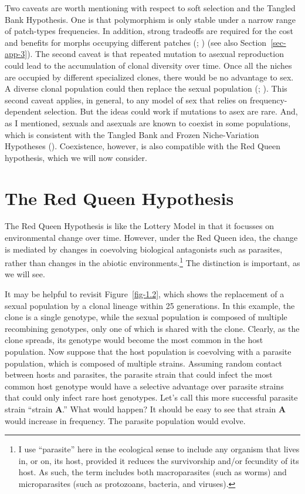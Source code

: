 \documentclass[
  american,
  letterpaper,
]{book}
\begin{document}
Two caveats are worth mentioning with respect to soft selection and the
Tangled Bank Hypothesis. One is that polymorphism is only stable under a
narrow range of patch-types frequencies. In addition, strong tradeoffs
are required for the cost and benefits for morphs occupying different
patches (;
) (see also
Section~\ref{sec-app-3}). The second caveat is that repeated mutation to
asexual reproduction could lead to the accumulation of clonal diversity
over time. Once all the niches are occupied by different specialized
clones, there would be no advantage to sex. A diverse clonal population
could then replace the sexual population (; ). This
second caveat applies, in general, to any model of sex that relies on
frequency-dependent selection. But the ideas could work if mutations to
asex are rare. And, as I mentioned, sexuals and asexuals are known to
coexist in some populations, which is consistent with the Tangled Bank
and Frozen Niche-Variation Hypotheses
().
Coexistence, however, is also compatible with the Red Queen hypothesis,
which we will now consider.

\section{The Red Queen Hypothesis}\label{the-red-queen-hypothesis}

The Red Queen Hypothesis is like the Lottery Model in that it focusses
on environmental change over time. However, under the Red Queen idea,
the change is mediated by changes in coevolving biological antagonists
such as parasites, rather than changes in the abiotic
environments.\footnote{I use ``parasite'' here in the ecological sense
  to include any organism that lives in, or on, its host, provided it
  reduces the survivorship and/or fecundity of its host. As such, the
  term includes both macroparasites (such as worms) and microparasites
  (such as protozoans, bacteria, and viruses).} The distinction is
important, as we will see.

It may be helpful to revisit Figure~\ref{fig-1.2}, which shows the
replacement of a sexual population by a clonal lineage within 25
generations. In this example, the clone is a single genotype, while the
sexual population is composed of multiple recombining genotypes, only
one of which is shared with the clone. Clearly, as the clone spreads,
its genotype would become the most common in the host population. Now
suppose that the host population is coevolving with a parasite
population, which is composed of multiple strains. Assuming random
contact between hosts and parasites, the parasite strain that could
infect the most common host genotype would have a selective advantage
over parasite strains that could only infect rare host genotypes. Let's
call this more successful parasite strain ``strain \textbf{A}.'' What
would happen? It should be easy to see that strain \textbf{A} would
increase in frequency. The parasite population would evolve.
\end{document}
